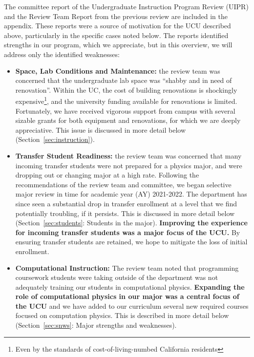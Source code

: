 \documentclass[12pt]{article}
\begin{document}
\noindent
The committee report of the Undergraduate Instruction Program Review
(UIPR) and the Review Team Report from the previous review are
included in the appendix.  These reports were a source of motivation
for the UCU described above, particularly in the specific cases noted
below.  The reports identified strengths in our program, which we
appreciate, but in this overview, we will address only the identified
weaknesses:
\begin{itemize}

\item {\bf Space, Lab Conditions and Maintenance:} the review team was
  concerned that the undergraduate lab space was ``shabby and in need
  of renovation''.  Within the UC, the cost of building renovations is
  shockingly expensive\footnote{Even by the standards of
    cost-of-living-numbed California residents}, and the university
  funding available for renovations is limited.  Fortunately, we have
  received vigorous support from campus with several sizable grants
  for both equipment and renovations, for which we are deeply
  appreciative.  This issue is discussed in more detail below (Section~\ref{sec:instruction}).
  
\item {\bf Transfer Student Readiness:} the review team was concerned
  that many incoming transfer students were not prepared for a physics
  major, and were dropping out or changing major at a high rate.
  Following the recommendations of the review team and committee, we
  began selective major review in time for academic year (AY)
  2021-2022.  The department has since seen a substantial drop in
  transfer enrollment at a level that we find potentially troubling,
  if it persists.  This is discussed in more detail below
  (Section~\ref{sec:students}: Students in the major).  {\bf Improving
    the experience for incoming transfer students was a major focus of
    the UCU.}  By ensuring transfer students are retained, we hope to
  mitigate the loss of initial enrollment.

\item {\bf Computational Instruction:} The review team noted that
  programming coursework students were taking outside of the
  department was not adequately training our students in computational
  physics.  {\bf Expanding the role of computational physics in our
    major was a central focus of the UCU} and we have added to our
  curriculum several new required courses focused on computation
  physics.  This is described in more detail below
  (Section~\ref{sec:snws}: Major strengths and weaknesses).
  

\end{itemize}
\end{document}
